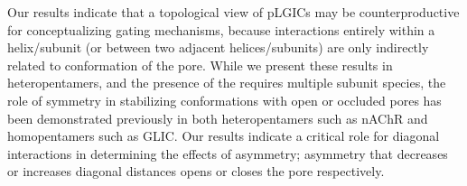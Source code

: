\documentclass[9pt,twocolumn,twoside,lineno]{pnas-new}
\begin{document}
Our results indicate that a topological view of pLGICs may be counterproductive for conceptualizing gating mechanisms, because interactions entirely within a helix/subunit (or between two adjacent helices/subunits) are only indirectly related to conformation of the pore.  %
While we present these results in heteropentamers, and the presence of the \triad requires multiple subunit species, the role of symmetry in stabilizing conformations with open or occluded pores has been demonstrated previously in both heteropentamers such as nAChR\cite{Mitra2005} and homopentamers such as GLIC. \cite{Mowrey2013} Our results indicate a critical role for diagonal interactions in determining the effects of asymmetry; asymmetry that decreases or increases diagonal distances opens or closes the pore respectively.  %

\end{document}
